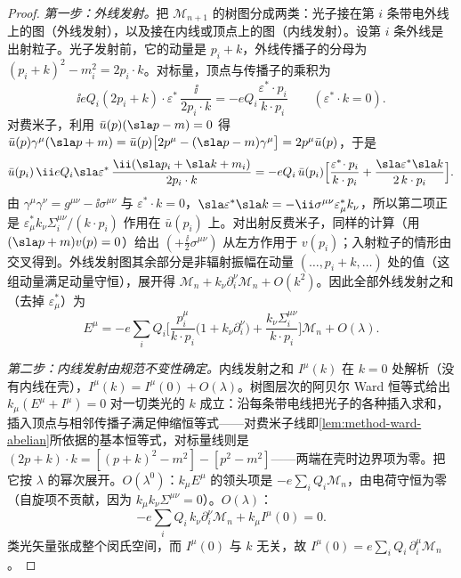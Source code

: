 \begin{proof}
\emph{第一步：外线发射。}把 $\mathcal M_{n+1}$ 的树图分成两类：光子接在第 $i$ 条带电外线上的图（外线发射），以及接在内线或顶点上的图（内线发射）。设第 $i$ 条外线是出射粒子。光子发射前，它的动量是 $p_i+k$，外线传播子的分母为 $(p_i+k)^2-m_i^2=2p_i\cdot k$。对标量，顶点与传播子的乘积为
\begin{equation*}
\ii eQ_i(2p_i+k)\cdot\varepsilon^*\,\frac{\ii}{2p_i\cdot k}=-eQ_i\frac{\varepsilon^*\!\cdot p_i}{k\cdot p_i}\qquad(\varepsilon^*\!\cdot k=0).
\end{equation*}
对费米子，利用 $\bar u(p)(\sla p-m)=0$ 得 $\bar u(p)\gamma^\mu(\sla p+m)=\bar u(p)\big[2p^\mu-(\sla p-m)\gamma^\mu\big]=2p^\mu\bar u(p)$，于是
\begin{equation*}
\bar u(p_i)\,\ii eQ_i\sla\varepsilon^*\,\frac{\ii(\sla p_i+\sla k+m_i)}{2p_i\cdot k}=-eQ_i\,\bar u(p_i)\Big[\frac{\varepsilon^*\!\cdot p_i}{k\cdot p_i}+\frac{\sla\varepsilon^*\sla k}{2\,k\cdot p_i}\Big].
\end{equation*}
由 $\gamma^\mu\gamma^\nu=g^{\mu\nu}-\ii\sigma^{\mu\nu}$ 与 $\varepsilon^*\!\cdot k=0$，$\sla\varepsilon^*\sla k=-\ii\sigma^{\mu\nu}\varepsilon^*_\mu k_\nu$，所以第二项正是 $\varepsilon^*_\mu k_\nu\Sigma_i^{\mu\nu}/(k\cdot p_i)$ 作用在 $\bar u(p_i)$ 上。对出射反费米子，同样的计算（用 $(\sla p+m)v(p)=0$）给出 $(+\frac{\ii}{2}\sigma^{\mu\nu})$ 从左方作用于 $v(p_i)$；入射粒子的情形由交叉得到。外线发射图其余部分是非辐射振幅在动量 $(\dots,p_i+k,\dots)$ 处的值（这组动量满足动量守恒），展开得 $\mathcal M_n+k_\nu\partial_i^\nu\mathcal M_n+O(k^2)$。因此全部外线发射之和（去掉 $\varepsilon^*_\mu$）为
\begin{equation}\label{eq:power-lbk-ext}
E^\mu=-e\sum_iQ_i\Big[\frac{p_i^\mu}{k\cdot p_i}\big(1+k_\nu\partial_i^\nu\big)+\frac{k_\nu\Sigma_i^{\mu\nu}}{k\cdot p_i}\Big]\mathcal M_n+O(\lambda).
\end{equation}

\emph{第二步：内线发射由规范不变性确定。}内线发射之和 $I^\mu(k)$ 在 $k=0$ 处解析（没有内线在壳），$I^\mu(k)=I^\mu(0)+O(\lambda)$。树图层次的阿贝尔 Ward 恒等式给出 $k_\mu(E^\mu+I^\mu)=0$ 对一切类光的 $k$ 成立：沿每条带电线把光子的各种插入求和，插入顶点与相邻传播子满足伸缩恒等式——对费米子线即\cref{lem:method-ward-abelian}所依据的基本恒等式，对标量线则是 $(2p+k)\cdot k=[(p+k)^2-m^2]-[p^2-m^2]$——两端在壳时边界项为零。把它按 $\lambda$ 的幂次展开。$O(\lambda^0)$：$k_\mu E^\mu$ 的领头项是 $-e\sum_iQ_i\mathcal M_n$，由电荷守恒为零（自旋项不贡献，因为 $k_\mu k_\nu\Sigma^{\mu\nu}=0$）。$O(\lambda)$：
\begin{equation*}
-e\sum_iQ_i\,k_\nu\partial_i^\nu\mathcal M_n+k_\mu I^\mu(0)=0 .
\end{equation*}
类光矢量张成整个闵氏空间，而 $I^\mu(0)$ 与 $k$ 无关，故 $I^\mu(0)=e\sum_iQ_i\,\partial_i^\mu\mathcal M_n$。


\end{proof}

